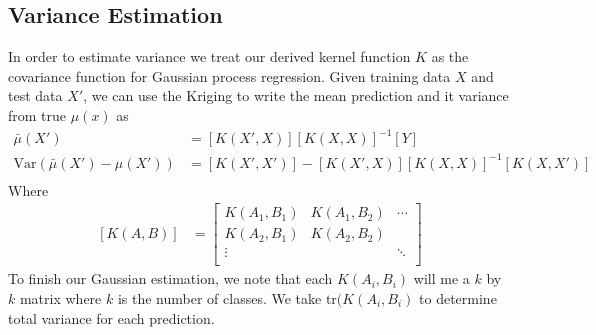 \subsection{Variance Estimation}
In order to estimate variance we treat our derived kernel function $K$ as the covariance function for Gaussian process regression. Given training data $X$ and test data $X'$, we can use the Kriging to write the mean prediction and it variance from true $\mu(x)$ as
\begin{align}
    \bar \mu(X') &= \left[ K(X', X)\right] \left[ K(X, X) \right]^{-1} \left[ Y \right]\\
    \text{Var}(\bar \mu(X') - \mu(X')) &= \left[K(X', X') \right] - \left[ K(X', X)\right] \left[ K(X, X) \right]^{-1} \left[ K(X, X') \right]\\
\end{align}
Where 
\begin{align}
    \left[K(A, B) \right] &= \begin{bmatrix} K(A_1, B_1) & K(A_1, B_2) & \cdots \\
                                             K(A_2, B_1) & K(A_2, B_2) &  \\
                                             \vdots &  & \ddots \\ \end{bmatrix}
\end{align}
To finish our Gaussian estimation, we note that each $K(A_i, B_i)$ will me a $k$ by $k$ matrix where $k$ is the number of classes. We take $\text{tr}(K(A_i, B_i)$ to determine total variance for each prediction. 

